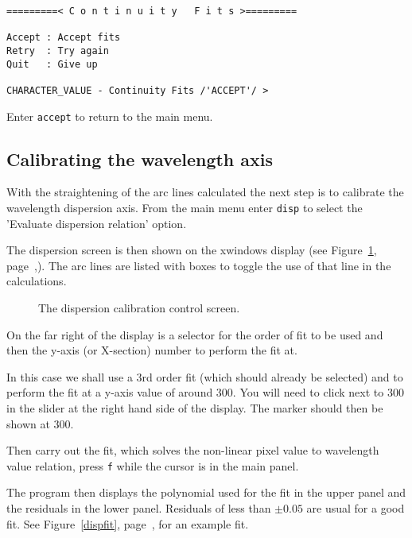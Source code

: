 \documentclass[twoside,11pt]{article}
\newcommand{\scspec}[2]{#1}
\newcommand{\scspec}[2]{#2}
\begin{document}
{\scspec{\small}{ }
\begin{verbatim}
=========< C o n t i n u i t y   F i t s >=========

Accept : Accept fits
Retry  : Try again
Quit   : Give up

CHARACTER_VALUE - Continuity Fits /'ACCEPT'/ > 
\end{verbatim}
}

Enter {\tt accept} to return to the main menu.

\subsection{Calibrating the wavelength axis}


With the straightening of the arc lines calculated the next step is to
calibrate the wavelength dispersion axis. From the main menu enter
{\tt disp} to select the 'Evaluate dispersion relation' option.

The dispersion screen is then shown on the xwindows display (see
\scspec{Figure~\ref{dispdisplay}, page~\pageref{dispdisplay},}{the
figure below}). The arc lines are listed with boxes to toggle the use
of that line in the calculations.

\begin{figure}
\begin{center}
  \scspec{\leavevmode\epsfysize=105mm\epsfbox{sc7_17.eps}}
          {\leavevmode\epsfysize=136mm}

  \parbox{140mm}{
    \caption{The dispersion calibration control screen.}
    \label{dispdisplay}
  }
\end{center}
\end{figure}


On the far right of the display is a selector for the order of fit to be used 
and then the y-axis (or X-section) number to perform the fit at.

In this case we shall use a 3rd order fit (which should already be
selected) and to perform the fit at a y-axis value of around 300. You
will need to click next to 300 in the slider at the right hand side of
the display. The marker should then be shown at 300.

Then carry out the fit, which solves the non-linear pixel value to
wavelength value relation, press {\tt f} while the cursor is in the
main panel.

The program then displays the polynomial used for the fit in the upper
panel and the residuals in the lower panel. Residuals of less than
$\pm0.05$ are usual for a good fit. See \scspec{Figure~\ref{dispfit},
page~\pageref{dispfit},}{the figure below} for an example fit.
\end{document}
